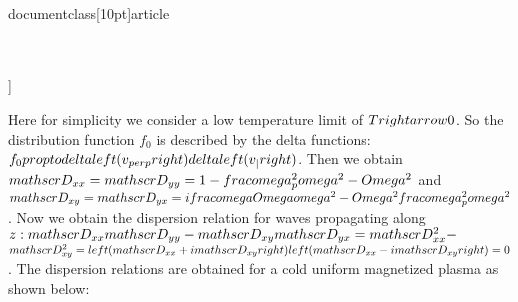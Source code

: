 \\documentclass[10pt]{article}
\begin{document}
{{{{\\[
\\mathbf{I}_{\\perp}=\\left[\\begin{array}{l}
1,0,0  \\tag{6.146}\\\\
0,1,0 \\\\
0,0,0
\\end{array}\\right]
\\]

Here for simplicity we consider a low temperature limit of $T \\rightarrow 0$. So the distribution function $f_{0}$ is described by the delta functions: $f_{0} \\propto \\delta\\left(v_{\\perp}\\right) \\delta\\left(v_{\\|}\\right)$. Then we obtain $\\mathscr{D}_{x x}=\\mathscr{D}_{y y}=1-\\frac{\\omega_{p}^{2}}{\\omega^{2}-\\Omega^{2}}$ and $\\mathscr{D}_{x y}=\\mathscr{D}_{y x}=i \\frac{\\omega \\Omega}{\\omega^{2}-\\Omega^{2}} \\frac{\\omega_{p}^{2}}{\\omega^{2}}$. Now we obtain the dispersion relation for waves propagating along $z: \\mathscr{D}_{x x} \\mathscr{D}_{y y}-\\mathscr{D}_{x y} \\mathscr{D}_{y x}=\\mathscr{D}_{x x}^{2}-$ $\\mathscr{D}_{x y}^{2}=\\left(\\mathscr{D}_{x x}+i \\mathscr{D}_{x y}\\right)\\left(\\mathscr{D}_{x x}-i \\mathscr{D}_{x y}\\right)=0$. The dispersion relations are obtained for a cold uniform magnetized plasma as shown below:


}}}}
\end{document}
